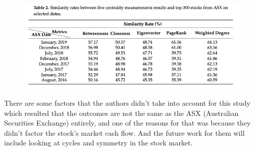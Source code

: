\documentclass[11pt, oneside]{article}   	%
\begin{document}
\begin{Large}
\begin{figure}[htbp] %
   \centering
   \includegraphics[width=6in]{comparison_of_similarity} 
\end{figure}

There are some factors that the authors didn't take into account for this study which resulted that the outcomes are not the same as the ASX (Australian Securities Exchange) entirely, and one of the reasons for that was because they didn't factor the stock's market cash flow.  And the future work for them will include looking at cycles and symmetry in the stock market.




\end{Large}
\end{document}
